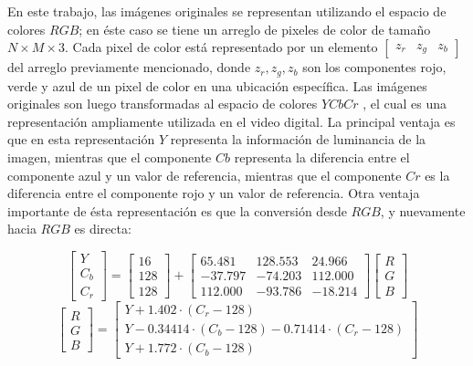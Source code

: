 En este trabajo, las imágenes originales se representan utilizando el espacio de colores $RGB$; en éste caso se tiene un arreglo de pixeles de color de tamaño $N \times M \times 3$. Cada pixel de color está representado por un elemento $[\begin{matrix}z_r & z_g & z_b\end{matrix}]$ del arreglo previamente mencionado, donde $z_r, z_g, z_b$ son los componentes rojo, verde y azul de un pixel de color en una ubicación específica. Las imágenes originales son luego transformadas al espacio de colores $YCbCr$ \cite{gonzalez2002processing}, el cual es una representación ampliamente utilizada en el video digital. La principal ventaja es que en esta representación $Y$ representa la información de luminancia de la imagen, mientras que el componente $Cb$ representa la diferencia entre el componente azul y un valor de referencia, mientras que el componente $Cr$ es la diferencia entre el componente rojo y un valor de referencia. Otra ventaja importante de ésta representación es que la conversión desde $RGB$, y nuevamente hacia $RGB$ es directa:

\begin{equation}
\begin{bmatrix}
Y \\
C_b \\
C_r 
\end{bmatrix} =
\begin{bmatrix}
16  \\
128 \\
128
\end{bmatrix}
+
\begin{bmatrix}
65.481 & 128.553 & 24.966 \\
-37.797 & -74.203 & 112.000 \\
112.000 & -93.786 & -18.214 
\end{bmatrix}
\begin{bmatrix}
R \\
G \\
B 
\end{bmatrix}
\end{equation}
\begin{equation}
\begin{bmatrix}
R \\
G \\
B 
\end{bmatrix} =
\begin{bmatrix}
Y + 1.402 \cdot (C_r - 128) \\
Y -0.34414 \cdot (C_b - 128) - 0.71414 \cdot (C_r - 128) \\
Y + 1.772 \cdot  (C_b - 128) 
\end{bmatrix}
\end{equation}


